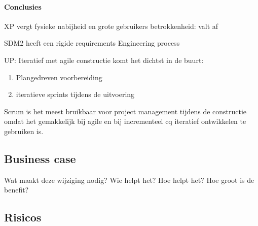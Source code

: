 \paragraph{Conclusies}
\begin{description}
\item XP vergt fysieke nabijheid en grote gebruikers betrokkenheid: valt af
\item SDM2 heeft een rigide requirements Engineering process
\item UP: Iteratief met agile constructie komt het dichtst in de buurt:
\begin{enumerate}
 \item Plangedreven voorbereiding
 \item iteratieve sprints tijdens de uitvoering
\end{enumerate}
\end{description}

Scrum is het meest bruikbaar voor project management tijdens de constructie omdat
het gemakkelijk bij agile en bij incrementeel cq iteratief ontwikkelen te gebruiken is.

\subsection{Business case}

Wat maakt deze wijziging nodig? Wie helpt het? Hoe helpt het?
Hoe groot is de benefit?

\subsection{Risicos}

